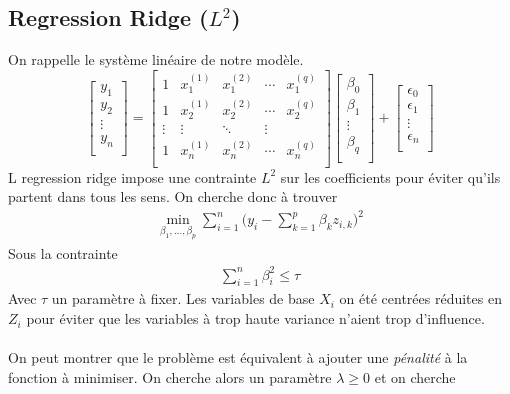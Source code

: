 \documentclass[a4paper]{article}
\begin{document}
\subsection{Regression Ridge ($L^2$)}
On rappelle le système linéaire de notre modèle. 
\[
\begin{bmatrix}
y_1 \\
y_2 \\
\vdots \\
y_n \\
\end{bmatrix} = 
\begin{bmatrix}
1 & x_1^{(1)} & x_1^{(2)} & \cdots & x_1^{(q)} \\
1 & x_2^{(1)} & x_2^{(2)} & \cdots & x_2^{(q)} \\
\vdots & \vdots & \ddots & \vdots \\
1 & x_n^{(1)} & x_n^{(2)} & \cdots & x_n^{(q)} \\
\end{bmatrix}
\begin{bmatrix}
\beta_0 \\
\beta_1 \\
\vdots \\
\beta_q \\
\end{bmatrix}
+
\begin{bmatrix}
\epsilon_0 \\
\epsilon_1 \\
\vdots \\
\epsilon_n \\
\end{bmatrix}
\]
L regression ridge impose une contrainte $L^2$ sur les coefficients pour éviter qu'ils partent dans tous les sens. On cherche donc à trouver
\begin{align}
    \min_{\beta_1, \dots, \beta_p} \sum_{i=1}^{n} \bigg( y_i - \sum_{k=1}^{p} \beta_k z_{i,k} \bigg)^2
\end{align}
Sous la contrainte 
\begin{align*}
    \sum_{i=1}^{n} \beta_i ^2 \leq \tau
\end{align*}
Avec $\tau$ un paramètre à fixer. Les variables de base $X_i$ on été centrées réduites en $Z_i$ pour éviter que les variables à trop haute variance n'aient trop d'influence.
\\
\vspace{1mm}
\\
On peut montrer que le problème est équivalent à ajouter une \textit{pénalité} à la fonction à minimiser. On cherche alors un paramètre $\lambda \geq 0$ et on cherche
\end{document}
